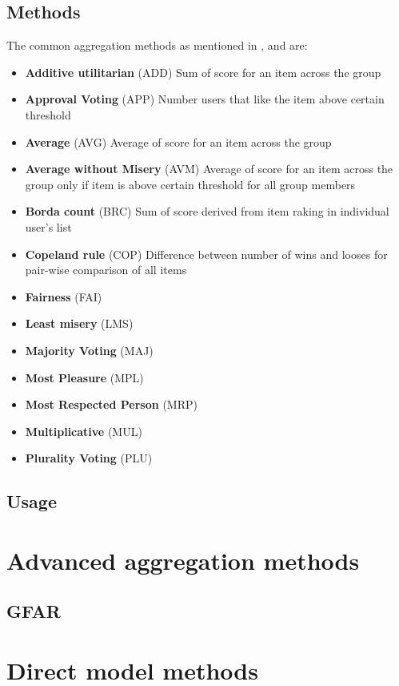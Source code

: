 \subsection{Methods}
The common aggregation methods as mentioned in \cite{grouprecommendersystems_felfernig2018group}, \cite{masthoff_2011_group_rec_systems} and \cite{masthoff_2004_group_modeling} are:
\begin{itemize}
    \item \textbf{Additive utilitarian} (ADD)\newline
    Sum of score for an item across the group
    \item \textbf{Approval Voting} (APP)\newline
    Number users that like the item above certain threshold
    \item \textbf{Average} (AVG)\newline
    Average of score for an item across the group
    \item \textbf{Average without Misery} (AVM)\newline
    Average of score for an item across the group only if item is above certain threshold for all group members
    \item \textbf{Borda count} (BRC)\newline
    Sum of score derived from item raking in individual user's list
    \item \textbf{Copeland rule} (COP)\newline
    Difference between number of wins and looses for pair-wise comparison of all items
    \item \textbf{Fairness} (FAI)\newline
    
    \item \textbf{Least misery} (LMS)\newline
    \item \textbf{Majority Voting} (MAJ)\newline
    \item \textbf{Most Pleasure} (MPL)\newline
    \item \textbf{Most Respected Person} (MRP)\newline
    \item \textbf{Multiplicative} (MUL)\newline
    \item \textbf{Plurality Voting} (PLU)\newline
\end{itemize}
\subsection{Usage}

\section{Advanced aggregation methods}\label{sec:03_advanced_aggregation_methods}
\subsection{GFAR}

\section{Direct model methods}